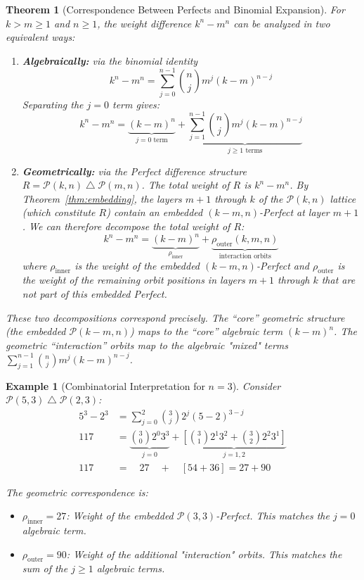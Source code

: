 \documentclass[11pt]{article}
\DeclareMathOperator{\diffop}{\triangle}
\newcommand{\diff}{\mathbin{\diffop}}
\newcommand{\perfect}{\mathcal{P}}
\newtheorem{theorem}[definition]{Theorem}
\newtheorem{example}[definition]{Example}
\begin{document}
\begin{theorem}[Correspondence Between Perfects and Binomial Expansion]\label{thm:binomial-correspondence}
For $k > m \geq 1$ and $n \geq 1$, the weight difference $k^n - m^n$ can be analyzed in two equivalent ways:

\begin{enumerate}
    \item \textbf{Algebraically:} via the binomial identity
    \[
    k^n - m^n = \sum_{j=0}^{n-1} \binom{n}{j} m^j (k-m)^{n-j}
    \]
    Separating the $j=0$ term gives:
    \[
    k^n - m^n = \underbrace{(k-m)^n}_{j=0 \text{ term}} + \underbrace{\sum_{j=1}^{n-1} \binom{n}{j} m^j (k-m)^{n-j}}_{j \geq 1 \text{ terms}}
    \]
    
    \item \textbf{Geometrically:} via the Perfect difference structure $R = \perfect(k,n) \diff \perfect(m,n)$.
    The total weight of $R$ is $k^n - m^n$. By Theorem~\ref{thm:embedding}, the layers $m+1$ through $k$ of the $\perfect(k,n)$ lattice (which constitute $R$) contain an embedded $(k-m,n)$-Perfect at layer $m+1$.
    We can therefore decompose the total weight of $R$:
    \[
    k^n - m^n = \underbrace{(k-m)^n}_{\rho_{\text{inner}}} + \underbrace{\rho_{\text{outer}}(k,m,n)}_{\text{interaction orbits}}
    \]
    where $\rho_{\text{inner}}$ is the weight of the embedded $(k-m,n)$-Perfect and $\rho_{\text{outer}}$ is the weight of the remaining orbit positions in layers $m+1$ through $k$ that are not part of this embedded Perfect.
\end{enumerate}

These two decompositions correspond precisely. The ``core'' geometric structure (the embedded $\perfect(k-m,n)$) maps to the ``core'' algebraic term $(k-m)^n$. The geometric ``interaction'' orbits map to the algebraic "mixed" terms $\sum_{j=1}^{n-1} \binom{n}{j} m^j (k-m)^{n-j}$.
\end{theorem}

\begin{example}[Combinatorial Interpretation for $n=3$]\label{ex:binomial-interpretation}
Consider $\perfect(5,3) \diff \perfect(2,3)$:
\begin{align*}
5^3 - 2^3 &= \sum_{j=0}^{2} \binom{3}{j} 2^j (5-2)^{3-j} \\
117 &= \underbrace{\binom{3}{0}2^0 3^3}_{j=0} + \underbrace{\left[ \binom{3}{1}2^1 3^2 + \binom{3}{2}2^2 3^1 \right]}_{j=1, 2} \\
117 &= \quad 27 \quad + \quad [ 54 + 36 ] = 27 + 90
\end{align*}

The geometric correspondence is:
\begin{itemize}
    \item $\rho_{\text{inner}} = 27$: Weight of the embedded $\perfect(3,3)$-Perfect. This matches the $j=0$ algebraic term.
    \item $\rho_{\text{outer}} = 90$: Weight of the additional "interaction" orbits. This matches the sum of the $j \geq 1$ algebraic terms.
\end{itemize}
\end{example}
\end{document}
